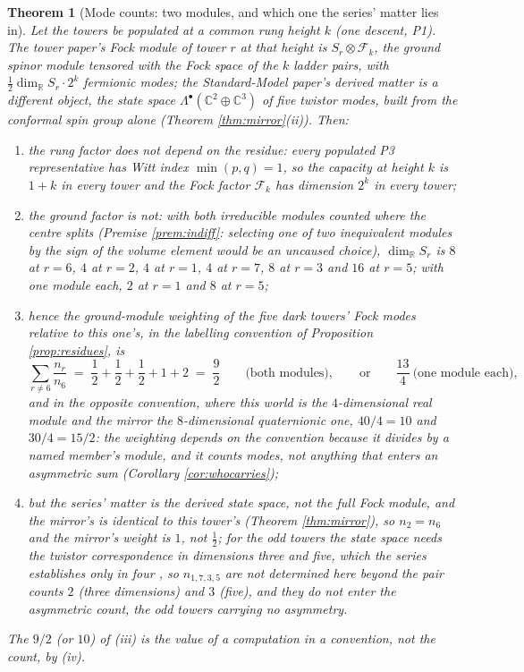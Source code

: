 \documentclass[11pt]{article}
\newtheorem{theorem}{Theorem}[section]
\theoremstyle{definition}
\newcommand{\R}{\mathbb{R}}
\newcommand{\C}{\mathbb{C}}
\begin{document}
\begin{theorem}[Mode counts: two modules, and which one the series' matter lies in]\label{thm:modes}
Let the towers be populated at a common rung height $k$ (one descent, P1). The tower paper's Fock module of tower $r$ at that height is $S_{r} \otimes \mathcal{F}_{k}$, the ground spinor module tensored with the Fock space of the $k$ ladder pairs, with $\tfrac{1}{2}\dim_{\R} S_{r} \cdot 2^{k}$ fermionic modes; the Standard-Model paper's derived matter is a different object, the state space $\Lambda^{\bullet}(\C^{2} \oplus \C^{3})$ of five twistor modes, built from the conformal spin group alone (Theorem \ref{thm:mirror}(ii)). Then:
\begin{enumerate}
\item[(i)] the rung factor does not depend on the residue: every populated P3 representative has Witt index $\min(p,q) = 1$, so the capacity at height $k$ is $1 + k$ in every tower \cite[Thm.~4.3]{ButlerT3} and the Fock factor $\mathcal{F}_{k}$ has dimension $2^{k}$ in every tower;
\item[(ii)] the ground factor is not: with both irreducible modules counted where the centre splits (Premise \ref{prem:indiff}: selecting one of two inequivalent modules by the sign of the volume element would be an uncaused choice), $\dim_{\R} S_{r}$ is $8$ at $r = 6$, $4$ at $r = 2$, $4$ at $r = 1$, $4$ at $r = 7$, $8$ at $r = 3$ and $16$ at $r = 5$; with one module each, $2$ at $r = 1$ and $8$ at $r = 5$;
\item[(iii)] hence the ground-module weighting of the five dark towers' Fock modes relative to this one's, in the labelling convention of Proposition \ref{prop:residues}, is
\[
\sum_{r \neq 6} \frac{n_{r}}{n_{6}} \;=\; \frac{1}{2} + \frac{1}{2} + \frac{1}{2} + 1 + 2 \;=\; \frac{9}{2} \qquad\text{(both modules)},\qquad\text{or}\qquad \frac{13}{4}\ \text{(one module each)},
\]
and in the opposite convention, where this world is the $4$-dimensional real module and the mirror the $8$-dimensional quaternionic one, $40/4 = 10$ and $30/4 = 15/2$: the weighting depends on the convention because it divides by a named member's module, and it counts modes, not anything that enters an asymmetric sum (Corollary \ref{cor:whocarries});
\item[(iv)] but the series' matter is the derived state space, not the full Fock module, and the mirror's is identical to this tower's (Theorem \ref{thm:mirror}), so $n_{2} = n_{6}$ and the mirror's weight is $1$, not $\tfrac{1}{2}$; for the odd towers the state space needs the twistor correspondence in dimensions three and five, which the series establishes only in four \cite{ButlerT9}, so $n_{1,7,3,5}$ are not determined here beyond the pair counts $2$ (three dimensions) and $3$ (five), and they do not enter the asymmetric count, the odd towers carrying no asymmetry.
\end{enumerate}
The $9/2$ (or $10$) of (iii) is the value of a computation in a convention, not the count, by (iv).
\end{theorem}
\end{document}
